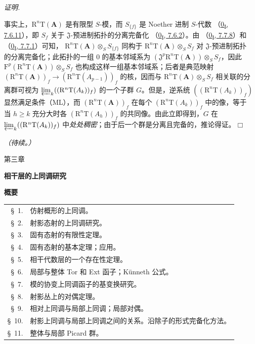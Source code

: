 \documentclass[UTF8,fontset=none,11pt,oneside,openany]{ctexbook}
\providecommand{\square}{\mdlgwhtsquare}
\newenvironment{proof}{%
  \par\smallskip\noindent\textit{证明.}\ %
}{\hfill$\square$\par}
\newcommand{\oldpage}[2][]{%
  \hypertarget{ega-source-page-#1-#2}{}%
  \marginnote{\scriptsize\textbf{#1}~|~#2}\ignorespaces}
\let\EGAOriginalLabel\label
\renewcommand{\label}[1]{\phantomsection\EGAOriginalLabel{#1}}
\begin{document}
\begin{proof}
事实上，$\mathrm R^n\mathrm T(\mathbf A)$ 是有限型 $S$-模，而
$S_{\{f\}}$ 是 Noether 进制 $S$-代数
（\hyperref[0.7.6.11-fr]{0\textsubscript{I}, 7.6.11}），即
$S_f$ 关于 $\mathfrak J$-预进制拓扑的分离完备化
（\hyperref[0.7.6.2-fr]{0\textsubscript{I}, 7.6.2}）。由
（\hyperref[0.7.7.8-fr]{0\textsubscript{I}, 7.7.8}）和
（\hyperref[0.7.7.1-fr]{0\textsubscript{I}, 7.7.1}）可知，
$\mathrm R^n\mathrm T(\mathbf A)\otimes_S S_{\{f\}}$ 同构于
$\mathrm R^n\mathrm T(\mathbf A)\otimes_S S_f$ 对
$\mathfrak J$-预进制拓扑的分离完备化；此拓扑的一组 $0$ 的基本邻域系为
$(\mathfrak J^p\mathrm R^n\mathrm T(\mathbf A))\otimes_S S_f$，因此
$\mathrm F^p(\mathrm R^n\mathrm T(\mathbf A))\otimes_S S_f$ 也构成这样一组基本邻域系；后者是典范映射
$(\mathrm R^n\mathrm T(\mathbf A))_f\to
(\mathrm R^n\mathrm T(A_{p-1}))_f$ 的核，因而与
$\mathrm R^n\mathrm T(\mathbf A)\otimes_S S_f$ 相关联的分离群可视为
$\varprojlim_k((\mathrm R^n\mathrm T(A_k))_f)$ 的一个子群 $G$。但是，逆系统
$((\mathrm R^n\mathrm T(A_k))_f)$ 显然满足条件（ML），而
$(\mathrm R^n\mathrm T(\mathbf A))_f$ 在每个
$(\mathrm R^n\mathrm T(A_k))_f$ 中的像，等于当 $h\geq k$ 充分大时各
$(\mathrm R^n\mathrm T(A_h))_f$ 的共同像。由此立即得到，$G$ 在
$\varprojlim_k((\mathrm R^n\mathrm T(A_k))_f)$ 中\emph{处处稠密}；由于后一个群是分离且完备的，推论得证。
\end{proof}

\begin{flushright}
\textit{（待续。）}
\end{flushright}

\clearpage
\thispagestyle{empty}
\null
\clearpage
\thispagestyle{plain}
\oldpage[III]{81}
\label{chapter:III-fr}

\begin{center}
{\large 第三章\par}
\vspace{1.5em}
{\Large\bfseries 相干层的上同调研究\par}
\vspace{1.8em}
{\bfseries 概要\par}
\end{center}

\medskip
\begin{tabular}{@{}r@{\ }p{}@{}}
\S~1. & 仿射概形的上同调。\\
\S~2. & 射影态射的上同调研究。\\
\S~3. & 固有态射的有限性定理。\\
\S~4. & 固有态射的基本定理；应用。\\
\S~5. & 相干代数层的一个存在性定理。\\
\S~6. & 局部与整体 Tor 和 Ext 函子；Künneth 公式。\\
\S~7. & 模的协变上同调函子的基变换研究。\\
\S~8. & 射影丛上的对偶定理。\\
\S~9. & 相对上同调与局部上同调；局部对偶。\\
\S~10. & 射影上同调与局部上同调之间的关系。沿除子的形式完备化方法。\\
\S~11. & 整体与局部 Picard 群\footnotemark。
\end{tabular}
\end{document}

